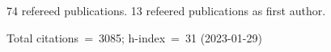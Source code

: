 74 refereed publications. 13 refeered publications as first author.

Total citations~=~3085; h-index~=~31 (2023-01-29)